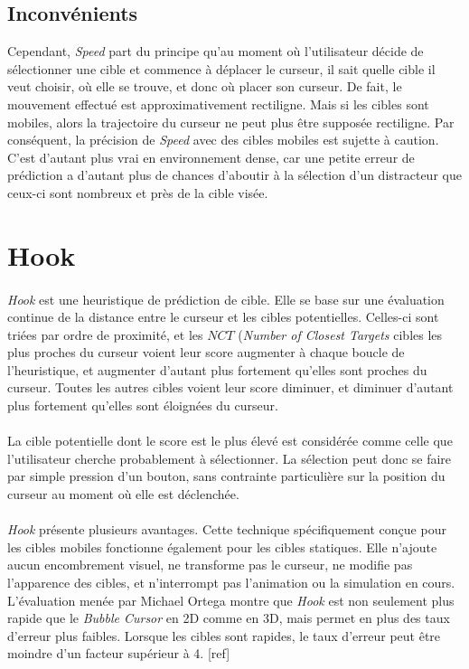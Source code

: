 	\subsection{Inconvénients}
	Cependant, \emph{Speed} part du principe qu'au moment où l'utilisateur décide de sélectionner une cible et commence à déplacer le curseur, il sait quelle cible il veut choisir, où elle se trouve, et donc où placer son curseur. De fait, le mouvement effectué est approximativement rectiligne. Mais si les cibles sont mobiles, alors la trajectoire du curseur ne peut plus être supposée rectiligne. Par conséquent, la précision de \emph{Speed} avec des cibles mobiles est sujette à caution. C'est d'autant plus vrai en environnement dense, car une petite erreur de prédiction a d'autant plus de chances d'aboutir à la sélection d'un distracteur que ceux-ci sont nombreux et près de la cible visée.
		
\section{Hook}
	\paragraph{}
	\emph{Hook} est une heuristique de prédiction de cible. Elle se base sur une évaluation continue de la distance entre le curseur et les cibles potentielles. Celles-ci sont triées par ordre de proximité, et les $NCT$ (\emph{Number of Closest Targets} cibles les plus proches du curseur voient leur score augmenter à chaque boucle de l'heuristique, et augmenter d'autant plus fortement qu'elles sont proches du curseur. Toutes les autres cibles voient leur score diminuer, et diminuer d'autant plus fortement qu'elles sont éloignées du curseur.
		
	\paragraph{}
	La cible potentielle dont le score est le plus élevé est considérée comme celle que l'utilisateur cherche probablement à sélectionner. La sélection peut donc se faire par simple pression d'un bouton, sans contrainte particulière sur la position du curseur au moment où elle est déclenchée.
		
	\paragraph{}
	\emph{Hook} présente plusieurs avantages. Cette technique spécifiquement conçue pour les cibles mobiles fonctionne également pour les cibles statiques. Elle n'ajoute aucun encombrement visuel, ne transforme pas le curseur, ne modifie pas l'apparence des cibles, et n'interrompt pas l'animation ou la simulation en cours. L'évaluation menée par Michael Ortega montre que \emph{Hook} est non seulement plus rapide que le \emph{Bubble Cursor} en 2D comme en 3D, mais permet en plus des taux d'erreur plus faibles. Lorsque les cibles sont rapides, le taux d'erreur peut être moindre d'un facteur supérieur à 4. [ref]

\clearpage

